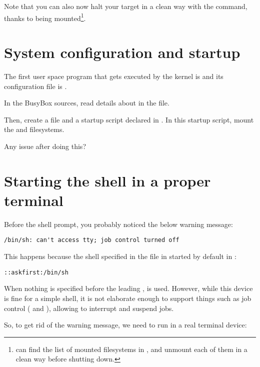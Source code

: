 Note that you can also now halt your target in a clean way with the 
command, thanks to  being mounted\footnote{
can find the list of mounted filesystems in , and
unmount each of them in a clean way before shutting down.}.

\section{System configuration and startup}

The first user space program that gets executed by the kernel is
 and its configuration file is .

In the BusyBox sources, read details about  in the
 file.

Then, create a  file and a 
startup script declared in . In this startup
script, mount the  and  filesystems.

Any issue after doing this?

\section{Starting the shell in a proper terminal}

Before the shell prompt, you probably noticed the below warning message:

\begin{verbatim}
/bin/sh: can't access tty; job control turned off
\end{verbatim}

This happens because the shell specified in the  file
in started by default in :

\begin{verbatim}
::askfirst:/bin/sh
\end{verbatim}

When nothing is specified before the leading \code{::}, 
is used. However, while this device is fine for a simple shell, it is
not elaborate enough to support things such as job control
(\code{[Ctrl][c]} and \code{[Ctrl][z]}), allowing to interrupt and
suspend jobs. 

So, to get rid of the warning message, we need  to run
 in a real terminal device:

